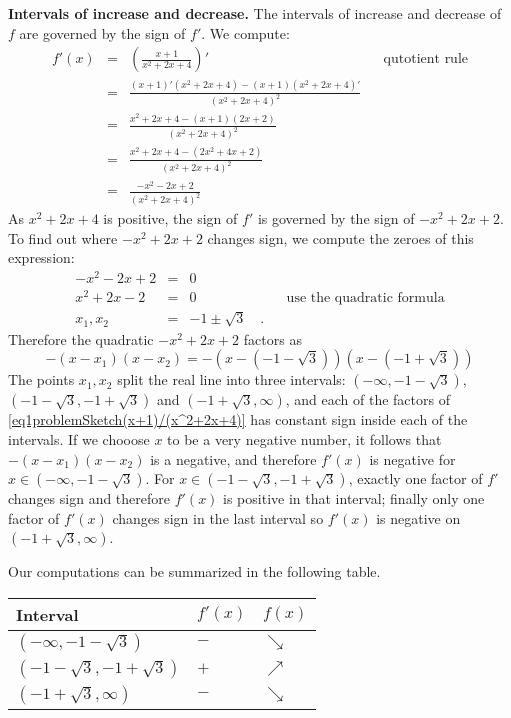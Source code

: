 {\textbf{Intervals of increase and decrease.} 
The intervals of increase and decrease of $f$ are governed by the sign of $f'$. We compute:
\[
\begin{array}{rcll|l}
f'(x)&=&\displaystyle \left(\frac{x+1}{x^2+2x+4}\right)' &&\text{qutotient rule}\\
&=&\displaystyle \frac{(x+1)'\left(x^2+ 2x+4\right)- (x+1)\left( x^2 +2 x+4\right)'}{\left(x^2+2x+4 \right)^2}\\
&=&\displaystyle\frac{ x^2+2x+4-(x+1)(2x+2)}{\left(x^2+2x+4 \right)^2}\\
&=&\displaystyle \frac{x^2+2x+4-\left( 2x^2+ 4x+ 2 \right)}{ \left( x^2 +2x+4 \right)^2}\\
&=&\displaystyle \frac{-x^2-2x+2}{\left(x^2+2x+4 \right)^2}
\end{array}
\] 
As $x^2+2x+4$ is positive, the sign of $f'$ is governed by the sign of $-x^2+2x+2$. To find out where $-x^2+2x+2$ changes sign, we compute the zeroes of this expression:
\[\begin{array}{rcll|l}
-x^2-2x+2&=&0\\
x^2+2x-2&=&0 &&\text{use the quadratic formula}\\
x_1, x_2&=& -1\pm \sqrt{3}\quad .
\end{array}
\]
Therefore the quadratic $-x^2+2x+2$ factors as 
\begin{equation}
\label{eq1problemSketch(x+1)/(x^2+2x+4)}
-(x-x_1)(x-x_2)=-\left(x-\left(-1-\sqrt{3}\right)\right)\left(x-\left(-1+\sqrt{3}\right)\right)
\end{equation} 
The points $x_1, x_2$ split the real line into three intervals: $(-\infty, -1-\sqrt{3})$, $(-1-\sqrt{3}, -1+\sqrt{3})$ and $(-1+ \sqrt{3}, \infty )$, and each of the factors of \eqref{eq1problemSketch(x+1)/(x^2+2x+4)} has constant sign inside each of the intervals. If we chooose $x$ to be a very negative number, it follows that $-(x-x_1)(x-x_2)$ is a negative, and therefore $ f'(x)$ is negative for $x\in(-\infty, -1-\sqrt{3})$. For $x\in (-1-\sqrt{3}, -1+\sqrt{3})$, exactly one factor of $f'$ changes sign and therefore $f'(x)$ is positive in that interval; finally only one factor of $f'(x)$ changes sign in the last interval so $f'(x)$ is negative on $(-1+ \sqrt{3}, \infty )$.

Our computations can be summarized in the following table. 

\begin{tabular}{|lll|}\hline
Interval & $f'(x)$ & $f(x)$   \\\hline
$(-\infty, -1-\sqrt{3})$ & $-$& $\searrow $ \\\hline
$(-1-\sqrt{3}, -1+\sqrt{3})$ &$+$&$\nearrow$\\\hline
$( -1+\sqrt{3}, \infty)$&$-$&$\searrow$ \\\hline
\end{tabular}

}
